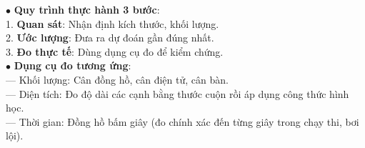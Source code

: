 \documentclass[14pt,a4paper,oneside]{extbook}
\begin{document}
\begin{minipage}[t]{0.49\textwidth}
  \begin{tcolorbox}[
    enhanced,
    title={\footnotesize\bfseries\color{white}\faWrench\ 2. Kĩ năng ước lượng \& Đo đạc},
    colback=teal!2!white,
    colframe=teal!75!black,
    arc=2.5mm, boxrule=0.8pt, top=1.8mm, bottom=1.8mm, left=2mm, right=2mm
  ]
    \footnotesize
    $\bullet$ \textbf{Quy trình thực hành 3 bước}:\\
    1. \textbf{Quan sát}: Nhận định kích thước, khối lượng.\\
    2. \textbf{Ước lượng}: Đưa ra dự đoán gần đúng nhất.\\
    3. \textbf{Đo thực tế}: Dùng dụng cụ đo để kiểm chứng.\\
    $\bullet$ \textbf{Dụng cụ đo tương ứng}:\\
    --- Khối lượng: Cân đồng hồ, cân điện tử, cân bàn.\\
    --- Diện tích: Đo độ dài các cạnh bằng thước cuộn rồi áp dụng công thức hình học.\\
    --- Thời gian: Đồng hồ bấm giây (đo chính xác đến từng giây trong chạy thi, bơi lội).
  \end{tcolorbox}
\end{minipage}

\vspace{2mm}
\end{document}
